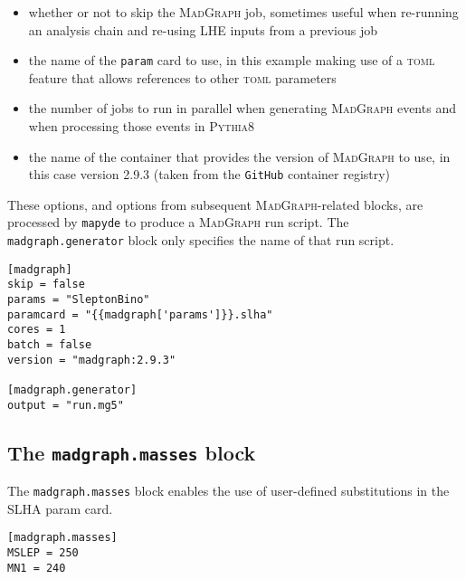 \documentclass{article}
\newcommand{\mapyde}{\texttt{mapyde}}
\newcommand{\madgraph}{\textsc{MadGraph}}
\newcommand{\pythia}{\textsc{Pythia8}}
\newcommand{\toml}{\textsc{toml}}
\begin{document}
\begin{itemize}
	\item whether or not to skip the \madgraph{} job, sometimes useful when re-running an analysis chain and re-using LHE inputs from a previous job
	\item the name of the \texttt{param} card to use, in this example making use of a \toml{} feature that allows references to other \toml{} parameters
	\item the number of jobs to run in parallel when generating \madgraph{} events and when processing those events in \pythia
	\item the name of the container that provides the version of \madgraph{} to use, in this case version 2.9.3 (taken from the \texttt{GitHub} container registry)
\end{itemize}



These options, and options from subsequent \madgraph-related blocks, are processed by \mapyde{} to produce a \madgraph{} run script.  The \texttt{madgraph.generator} block only specifies the name of that run script.

\begin{listing}[H]
	\begin{verbatim}
[madgraph]
skip = false
params = "SleptonBino"
paramcard = "{{madgraph['params']}}.slha"
cores = 1
batch = false
version = "madgraph:2.9.3"

[madgraph.generator]
output = "run.mg5"
        \end{verbatim}
	\caption{The \texttt{madgraph} block of an example \toml{} configuration file for generating slepton events.}
	\label{slepton-config-madgraph}
\end{listing}


\subsection{The \texttt{madgraph.masses} block}
\label{ssec:the-madgraph-masses-block}

The \texttt{madgraph.masses} block enables the use of user-defined substitutions in the SLHA param card.

\begin{listing}[H]
	\begin{verbatim}
[madgraph.masses]
MSLEP = 250
MN1 = 240
        \end{verbatim}
	\caption{The \texttt{madgraph.masses} block of an example \toml{} configuration file for generating slepton events.}
	\label{slepton-config-masses}
\end{listing}
\end{document}
